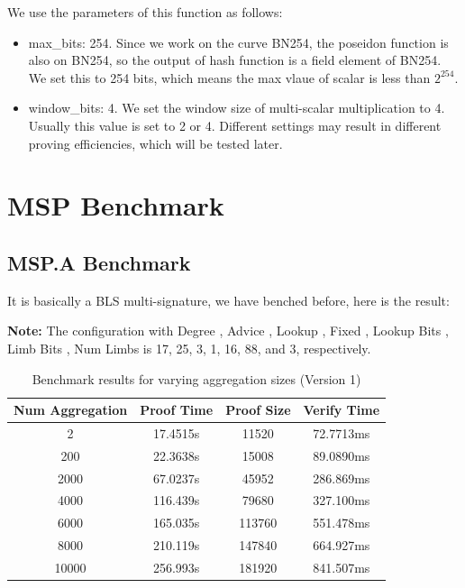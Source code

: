 \documentclass{article}
\begin{document}
We use the parameters of this function as follows:

\begin{itemize}
    \item max\_bits: 254. Since we work on the curve BN254, the poseidon function is also on BN254, so the output of hash function is a field element of BN254. We set this to 254 bits, which means the max vlaue of scalar is less than $2^{254}$.

    \item window\_bits: 4. We set the window size of multi-scalar multiplication to 4. Usually this value is set to 2 or 4. Different settings may result in different proving efficiencies, which will be tested later.
\end{itemize}


\section{MSP Benchmark}


\subsection{MSP.A Benchmark}

It is basically a BLS multi-signature, we have benched before, here is the result:


\textbf{Note:} The configuration with Degree , Advice , Lookup , Fixed , Lookup Bits , Limb Bits , Num Limbs is 17, 25, 3, 1, 16, 88, and 3, respectively.

\begin{table}[h]
    \centering
    \begin{tabular}{c|c|c|c} \hline
        Num Aggregation & Proof Time & Proof Size & Verify Time \\ \hline
        2 & 17.4515s & 11520 & 72.7713ms \\ \hline
        200 & 22.3638s & 15008 & 89.0890ms \\ \hline
        2000 & 67.0237s & 45952 & 286.869ms \\ \hline
        4000 & 116.439s & 79680 & 327.100ms \\ \hline
        6000 & 165.035s & 113760 & 551.478ms \\ \hline
        8000 & 210.119s & 147840 & 664.927ms \\ \hline
        10000 & 256.993s & 181920 & 841.507ms \\ \hline
    \end{tabular}
    \caption{Benchmark results for varying aggregation sizes (Version 1)}
    \label{tab:version1_agg}
\end{table}
\end{document}

